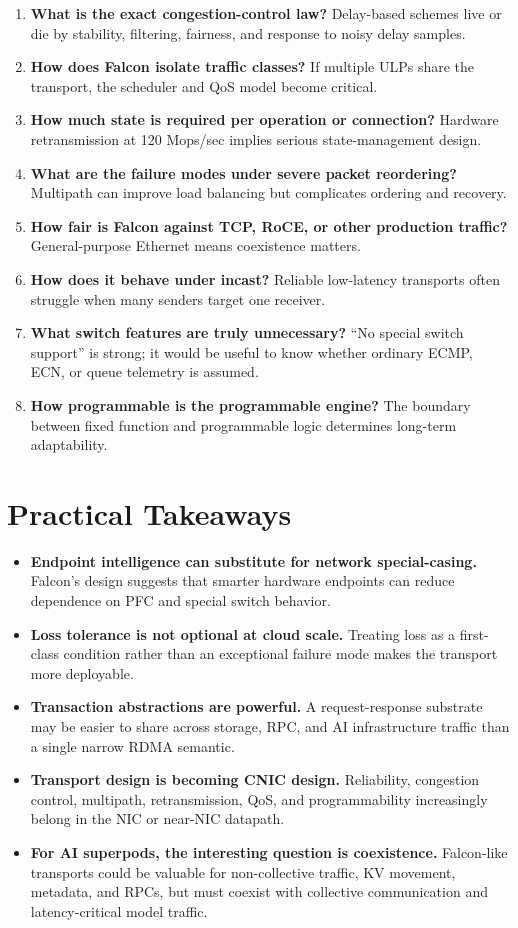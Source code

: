 \documentclass[11pt]{article}
\begin{document}
\begin{enumerate}
  \item \textbf{What is the exact congestion-control law?} Delay-based schemes live or die by stability, filtering, fairness, and response to noisy delay samples.
  \item \textbf{How does Falcon isolate traffic classes?} If multiple ULPs share the transport, the scheduler and QoS model become critical.
  \item \textbf{How much state is required per operation or connection?} Hardware retransmission at 120 Mops/sec implies serious state-management design.
  \item \textbf{What are the failure modes under severe packet reordering?} Multipath can improve load balancing but complicates ordering and recovery.
  \item \textbf{How fair is Falcon against TCP, RoCE, or other production traffic?} General-purpose Ethernet means coexistence matters.
  \item \textbf{How does it behave under incast?} Reliable low-latency transports often struggle when many senders target one receiver.
  \item \textbf{What switch features are truly unnecessary?} ``No special switch support'' is strong; it would be useful to know whether ordinary ECMP, ECN, or queue telemetry is assumed.
  \item \textbf{How programmable is the programmable engine?} The boundary between fixed function and programmable logic determines long-term adaptability.
\end{enumerate}

\section{Practical Takeaways}

\begin{itemize}
  \item \textbf{Endpoint intelligence can substitute for network special-casing.} Falcon's design suggests that smarter hardware endpoints can reduce dependence on PFC and special switch behavior.
  \item \textbf{Loss tolerance is not optional at cloud scale.} Treating loss as a first-class condition rather than an exceptional failure mode makes the transport more deployable.
  \item \textbf{Transaction abstractions are powerful.} A request-response substrate may be easier to share across storage, RPC, and AI infrastructure traffic than a single narrow RDMA semantic.
  \item \textbf{Transport design is becoming CNIC design.} Reliability, congestion control, multipath, retransmission, QoS, and programmability increasingly belong in the NIC or near-NIC datapath.
  \item \textbf{For AI superpods, the interesting question is coexistence.} Falcon-like transports could be valuable for non-collective traffic, KV movement, metadata, and RPCs, but must coexist with collective communication and latency-critical model traffic.
\end{itemize}
\end{document}

